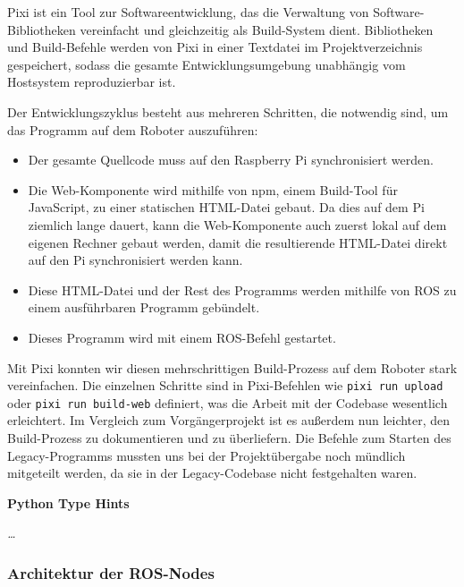 Pixi ist ein Tool zur Softwareentwicklung, das die Verwaltung von Software-Bibliotheken vereinfacht und gleichzeitig als Build-System dient. Bibliotheken und Build-Befehle werden von Pixi in einer Textdatei im Projektverzeichnis gespeichert, sodass die gesamte Entwicklungsumgebung unabhängig vom Hostsystem reproduzierbar ist.

Der Entwicklungszyklus besteht aus mehreren Schritten, die notwendig sind, um das Programm auf dem Roboter auszuführen:
\begin{itemize}
	\item Der gesamte Quellcode muss auf den Raspberry Pi synchronisiert werden.
	\item Die Web-Komponente wird mithilfe von npm, einem Build-Tool für JavaScript, zu einer statischen HTML-Datei gebaut. Da dies auf dem Pi ziemlich lange dauert, kann die Web-Komponente auch zuerst lokal auf dem eigenen Rechner gebaut werden, damit die resultierende HTML-Datei direkt auf den Pi synchronisiert werden kann.
	\item Diese HTML-Datei und der Rest des Programms werden mithilfe von ROS zu einem ausführbaren Programm gebündelt.
	\item Dieses Programm wird mit einem ROS-Befehl gestartet.
\end{itemize}

Mit Pixi konnten wir diesen mehrschrittigen Build-Prozess auf dem Roboter stark vereinfachen. Die einzelnen Schritte sind in Pixi-Befehlen wie \texttt{pixi run upload} oder \texttt{pixi run build-web} definiert, was die Arbeit mit der Codebase wesentlich erleichtert. Im Vergleich zum Vorgängerprojekt ist es außerdem nun leichter, den Build-Prozess zu dokumentieren und zu überliefern. Die Befehle zum Starten des Legacy-Programms mussten uns bei der Projektübergabe noch mündlich mitgeteilt werden, da sie in der Legacy-Codebase nicht festgehalten waren. 

\textbf{Python Type Hints}

\textit{\dots}

\subsubsection{Architektur der ROS-Nodes}


